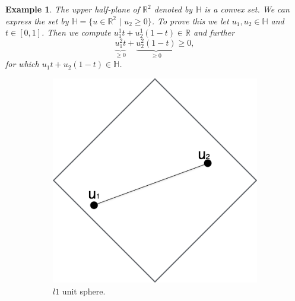 \documentclass[abstracton]{scrreprt}
\newtheorem{example}[theorem]{Example}
\begin{document}
        \begin{example}
            \label{ex:convex_set}
            The upper half-plane of $\mathbb{R}^{2}$ denoted by $\mathbb{H}$ is a convex set. We can express the set by $\mathbb{H} = \{u \in \mathbb{R}^{2} \,\, | \,\, u_{2} \ge 0\}$. To prove this we let $u_{1}, u_{2} \in \mathbb{H}$ and $t \in [0,1]$. Then we compute $u_{1}^{1}t + u_{2}^{1}(1-t) \in \mathbb{R}$ and further
                $$
                    \underbrace{u_{1}^{2}t}_{\ge 0} + \underbrace{u_{2}^{2}(1-t)}_{\ge 0} \ge 0,
                $$
            for which $u_{1}t + u_{2}(1-t) \in \mathbb{H}$.
        \end{example}
        \begin{figure}[!ht]
            \centering
            \begin{subfigure}[b]{0.3\textwidth}
                \includegraphics[width=\textwidth]{img/unit_l1_norm.png}
                \caption{$l1$ unit sphere.}
            \end{subfigure}
            \begin{subfigure}[b]{0.3\textwidth}

\end{subfigure}
\end{figure}
\end{document}
